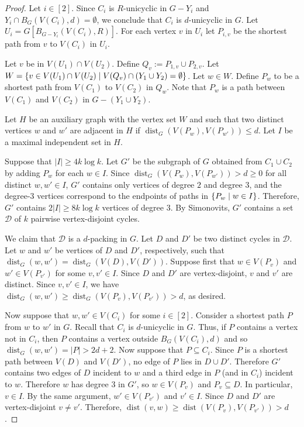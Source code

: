 \documentclass{patmorin}
\DeclareMathOperator{\dist}{dist}
\DeclarePairedDelimiter\set{\{}{\}}
\begin{document}
\begin{proof}
    Let $i\in[2]$.
    Since $C_i$ is $R$-unicyclic in $G-Y_i$ and $Y_i\cap B_G(V(C_i),d) = \emptyset$, we conclude that $C_i$ is $d$-unicyclic in $G$.
    Let $U_i = G[B_{G-Y_i}(V(C_i),R)]$.
    For each vertex $v$ in $U_i$ let $P_{i,v}$ be the shortest path from $v$ to $V(C_i)$ in $U_i$.

    Let $v$ be in $V(U_1)\cap V(U_2)$.
    Define $Q_v:= P_{1,v}\cup P_{2,v}$.
    Let $W=\set{v \in V(U_1)\cap V(U_2) \mid V(Q_v)\cap (Y_1\cup Y_2) =\emptyset}$.
    Let $w \in W$.
    Define $P_w$ to be a shortest path from $V(C_1)$ to $V(C_2)$ in $Q_w$.
    Note that $P_w$ is a path between $V(C_1)$ and $V(C_2)$ in $G-(Y_1\cup Y_2)$.


    Let $H$ be an auxiliary graph with the vertex set $W$ and such that two distinct vertices $w$ and $w'$ are adjacent in $H$ if $\dist_G(V(P_w),V(P_{w'}))\leq d$.
    Let $I$ be a maximal independent set in $H$.

    Suppose that $|I|\geq 4k\log k$.
    Let $G'$ be the subgraph of $G$ obtained from $C_1\cup C_2$ by adding $P_w$ for each $w\in I$.
    Since $\dist_G(V(P_w),V(P_{w'}))>d\ge0$ for all distinct $w,w'\in I$, $G'$ contains only vertices of degree $2$ and degree $3$, and the degree-$3$ vertices correspond to the endpoints of paths in $\set{P_w\mid w\in I}$.
    Therefore, $G'$ contains $2|I|\geq 8k\log k$ vertices of degree $3$.
    By Simonovits, $G'$ contains a set $\mathcal{D}$ of $k$ pairwise vertex-disjoint cycles.

    We claim that $\mathcal{D}$ is a $d$-packing in $G$.
    Let $D$ and $D'$ be two distinct cycles in $\mathcal{D}$.
    Let $w$ and $w'$ be vertices of $D$ and $D'$, respectively,
    such that $\dist_G(w,w')=\dist_G(V(D),V(D'))$.
    Suppose first that $w\in V(P_v)$ and $w'\in V(P_{v'})$ for some  $v,v' \in I$.
    Since $D$ and $D'$ are vertex-disjoint, $v$ and $v'$ are distinct.
    Since $v,v'\in I$, we have $\dist_G(w,w') \geq \dist_G(V(P_v),V(P_{v'}))>d$, as desired.

    Now suppose that $w, w' \in V(C_i)$ for some $i\in[2]$.
    Consider a shortest path $P$ from $w$ to $w'$ in $G$.
    Recall that $C_i$ is $d$-unicyclic in $G$.
    Thus, if $P$ contains a vertex not in $C_i$, then $P$ contains a vertex outside $B_G(V(C_i),d)$ and so $\dist_G(w,w')=|P|>2d+2$.
    Now suppose that $P\subseteq C_i$.
    Since $P$ is a shortest path between $V(D)$ and $V(D')$, no edge of $P$ lies in $D\cup D'$.
    Therefore $G'$ contains two edges of $D$ incident to $w$ and a third edge in $P$ (and in $C_i$) incident to $w$.
    Therefore $w$ has degree $3$ in $G'$, so $w\in V(P_{v})$ and $P_v\subseteq D$.
    In particular, $v\in I$.
    By the same argument, $w'\in V(P_{v'})$ and $v'\in I$.
    Since $D$ and $D'$ are vertex-disjoint $v\neq v'$.
    Therefore, $\dist(v,w)\ge \dist(V(P_v),V(P_{v'}))>d$.



\end{proof}
\end{document}
